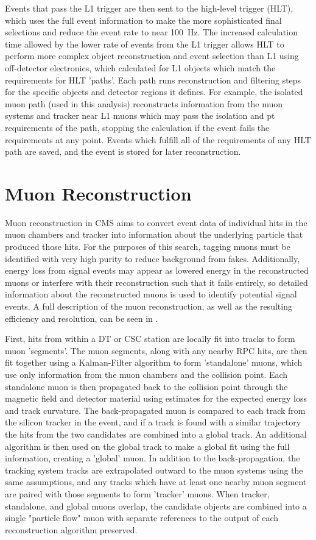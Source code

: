 Events that pass the L1 trigger are then sent to the high-level trigger (HLT), which uses the full event information to make the more sophisticated final selections and reduce the event rate to near \SI{100}{\hertz}.
The increased calculation time allowed by the lower rate of events from the L1 trigger allows HLT to perform more complex object reconstruction and event selection than L1 using off-detector electronics, which calculated for L1 objects which match the requirements for HLT 'paths'.
Each path runs reconstruction and filtering steps for the specific objects and detector regions it defines.
For example, the isolated muon path (used in this analysis) reconstructs information from the muon systems and tracker near L1 muons which may pass the isolation and pt requirements of the path, stopping the calculation if the event fails the requirements at any point.
Events which fulfill all of the requirements of any HLT path are saved, and the event is stored for later reconstruction.

\section{Muon Reconstruction}
\label{sec:muonReco}
Muon reconstruction in CMS aims to convert event data of individual hits in the muon chambers and tracker into information about the underlying particle that produced those hits.
For the purposes of this search, tagging muons must be identified with very high purity to reduce background from fakes. 
Additionally, energy loss from signal events may appear as lowered energy in the reconstructed muons or interfere with their reconstruction such that it fails entirely, so detailed information about the reconstructed muons is used to identify potential signal events.
A full description of the muon reconstruction, as well as the resulting efficiency and resolution, can be seen in \cite{cmsMuonPerformance}.

First, hits from within a DT or CSC station are locally fit into tracks to form muon 'segments'.
The muon segments, along with any nearby RPC hits, are then fit together using a Kalman-Filter algorithm to form 'standalone' muons, which use only information from the muon chambers and the collision point.
Each standalone muon is then propagated back to the collision point through the magnetic field and detector material using estimates for the expected energy loss and track curvature.
The back-propagated muon is compared to each track from the silicon tracker in the event, and if a track is found with a similar trajectory the hits from the two candidates are combined into a global track.
An additional \kf algorithm is then used on the global track to make a global fit using the full information, creating a 'global' muon. 
In addition to the back-propagation, the tracking system tracks are extrapolated outward to the muon systems using the same assumptions, and any tracks which have at least one nearby muon segment are paired with those segments to form 'tracker' muons. 
When tracker, standalone, and global muons overlap, the candidate objects are combined into a single "particle flow" muon with separate references to the output of each reconstruction algorithm preserved.

